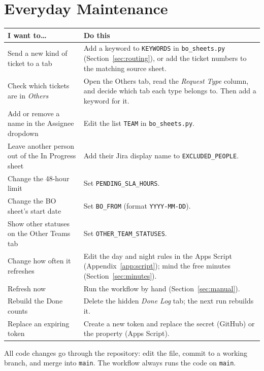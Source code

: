 \documentclass[11pt,a4paper]{article}
\newcommand{\code}[1]{\texttt{#1}}
\let\oldsection\section
\renewcommand{\section}{\needspace{12\baselineskip}\oldsection}
\begin{document}
\section{Everyday Maintenance}

\begin{longtable}{@{}p{4.9cm} p{9.3cm}@{}}
\toprule
\textbf{I want to\ldots} & \textbf{Do this} \\
\midrule
\endhead
Send a new kind of ticket to a tab & Add a keyword to \code{KEYWORDS} in \code{bo\_sheets.py} (Section~\ref{sec:routing}),
or add the ticket numbers to the matching source sheet. \\
Check which tickets are in \emph{Others} & Open the Others tab, read the \emph{Request Type} column, and decide which
tab each type belongs to. Then add a keyword for it. \\
Add or remove a name in the Assignee dropdown & Edit the list \code{TEAM} in \code{bo\_sheets.py}. \\
Leave another person out of the In Progress sheet & Add their Jira display name to \code{EXCLUDED\_PEOPLE}. \\
Change the 48-hour limit & Set \code{PENDING\_SLA\_HOURS}. \\
Change the BO sheet's start date & Set \code{BO\_FROM} (format \code{YYYY-MM-DD}). \\
Show other statuses on the Other Teams tab & Set \code{OTHER\_TEAM\_STATUSES}. \\
Change how often it refreshes & Edit the day and night rules in the Apps Script (Appendix~\ref{app:script}); mind the
free minutes (Section~\ref{sec:minutes}). \\
Refresh now & Run the workflow by hand (Section~\ref{sec:manual}). \\
Rebuild the Done counts & Delete the hidden \emph{Done Log} tab; the next run rebuilds it. \\
Replace an expiring token & Create a new token and replace the secret (GitHub) or the property (Apps Script). \\
\bottomrule
\end{longtable}

\noindent All code changes go through the repository: edit the file, commit to a working branch, and merge into
\code{main}. The workflow always runs the code on \code{main}.

\end{document}
